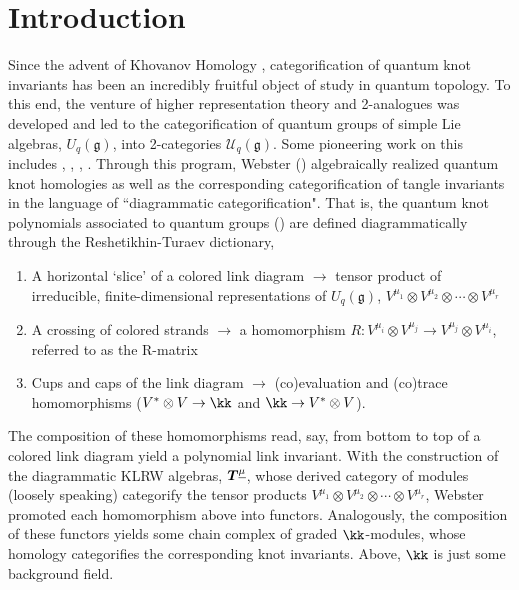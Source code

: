 \documentclass{article}
\begin{document}
\section{Introduction}\label{sec:intro}
Since the advent of Khovanov Homology \cite{Kh}, categorification of quantum knot invariants has been an incredibly fruitful object of study in quantum topology. To this end, the venture of higher representation theory and 2-analogues was developed and led to the categorification of quantum groups of simple Lie algebras, $U_q(\mathfrak{g})$, into 2-categories $\mathcal{U}_q(\mathfrak{g})$. Some pioneering work on this includes \cite{CR}, \cite{Rou}, \cite{Lau}, \cite{KL}. Through this program, Webster (\cite{Web}) algebraically realized quantum knot homologies as well as the corresponding categorification of tangle invariants in the language of ``diagrammatic categorification". That is, the quantum knot polynomials associated to quantum groups (\cite{RT}) are defined diagrammatically through the Reshetikhin-Turaev dictionary, 
\begin{enumerate}
    \item A horizontal `slice' of a colored link diagram $\longrightarrow$ tensor product of irreducible, finite-dimensional representations of $U_q(\mathfrak{g})$, $V^{\mu_1}\otimes V^{\mu_2}\otimes \cdots \otimes V^{\mu_r}$
    \item A crossing of colored strands $\longrightarrow$ a homomorphism $R:V^{\mu_i} \otimes V^{\mu_j} \rightarrow V^{\mu_j} \otimes V^{\mu_i}$, referred to as the R-matrix
    \item Cups and caps of the link diagram $\longrightarrow$ (co)evaluation and (co)trace homomorphisms ($V^*\otimes V \rightarrow \kk$ and $\kk\rightarrow V^* \otimes V$). 
\end{enumerate}
The composition of these homomorphisms read, say, from bottom to top of a colored link diagram yield a polynomial link invariant. With the construction of the diagrammatic KLRW algebras, ${\boldsymbol{T}}^{\underline{\mu}}$, whose derived category of modules (loosely speaking) categorify the tensor products $V^{\mu_1}\otimes V^{\mu_2}\otimes \cdots \otimes V^{\mu_r}$, Webster promoted each homomorphism above into functors. Analogously, the composition of these functors yields some chain complex of graded $\kk$-modules, whose homology categorifies the corresponding knot invariants. Above, $\kk$ is just some background field. \\ \\
\end{document}
